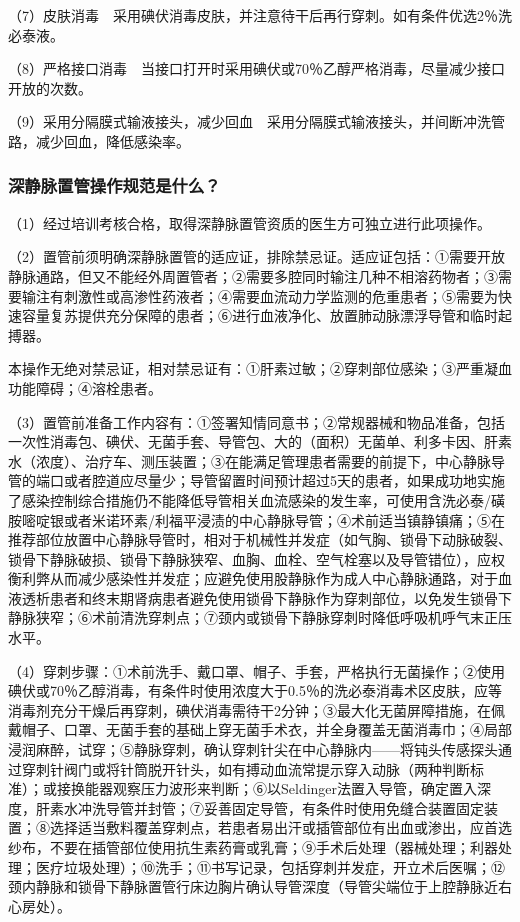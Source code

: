 （7）皮肤消毒　采用碘伏消毒皮肤，并注意待干后再行穿刺。如有条件优选2％洗必泰液。

（8）严格接口消毒　当接口打开时采用碘伏或70％乙醇严格消毒，尽量减少接口开放的次数。

（9）采用分隔膜式输液接头，减少回血　采用分隔膜式输液接头，并间断冲洗管路，减少回血，降低感染率。

\subsubsection{深静脉置管操作规范是什么？}

（1）经过培训考核合格，取得深静脉置管资质的医生方可独立进行此项操作。

（2）置管前须明确深静脉置管的适应证，排除禁忌证。适应证包括：①需要开放静脉通路，但又不能经外周置管者；②需要多腔同时输注几种不相溶药物者；③需要输注有刺激性或高渗性药液者；④需要血流动力学监测的危重患者；⑤需要为快速容量复苏提供充分保障的患者；⑥进行血液净化、放置肺动脉漂浮导管和临时起搏器。

本操作无绝对禁忌证，相对禁忌证有：①肝素过敏；②穿刺部位感染；③严重凝血功能障碍；④溶栓患者。

（3）置管前准备工作内容有：①签署知情同意书；②常规器械和物品准备，包括一次性消毒包、碘伏、无菌手套、导管包、大的（面积）无菌单、利多卡因、肝素水（浓度）、治疗车、测压装置；③在能满足管理患者需要的前提下，中心静脉导管的端口或者腔道应尽量少；导管留置时间预计超过5天的患者，如果成功地实施了感染控制综合措施仍不能降低导管相关血流感染的发生率，可使用含洗必泰/磺胺嘧啶银或者米诺环素/利福平浸渍的中心静脉导管；④术前适当镇静镇痛；⑤在推荐部位放置中心静脉导管时，相对于机械性并发症（如气胸、锁骨下动脉破裂、锁骨下静脉破损、锁骨下静脉狭窄、血胸、血栓、空气栓塞以及导管错位），应权衡利弊从而减少感染性并发症；应避免使用股静脉作为成人中心静脉通路，对于血液透析患者和终末期肾病患者避免使用锁骨下静脉作为穿刺部位，以免发生锁骨下静脉狭窄；⑥术前清洗穿刺点；⑦颈内或锁骨下静脉穿刺时降低呼吸机呼气末正压水平。

（4）穿刺步骤：①术前洗手、戴口罩、帽子、手套，严格执行无菌操作；②使用碘伏或70％乙醇消毒，有条件时使用浓度大于0.5％的洗必泰消毒术区皮肤，应等消毒剂充分干燥后再穿刺，碘伏消毒需待干2分钟；③最大化无菌屏障措施，在佩戴帽子、口罩、无菌手套的基础上穿无菌手术衣，并全身覆盖无菌消毒巾；④局部浸润麻醉，试穿；⑤静脉穿刺，确认穿刺针尖在中心静脉内------将钝头传感探头通过穿刺针阀门或将针筒脱开针头，如有搏动血流常提示穿入动脉（两种判断标准）；或接换能器观察压力波形来判断；⑥以Seldinger法置入导管，确定置入深度，肝素水冲洗导管并封管；⑦妥善固定导管，有条件时使用免缝合装置固定装置；⑧选择适当敷料覆盖穿刺点，若患者易出汗或插管部位有出血或渗出，应首选纱布，不要在插管部位使用抗生素药膏或乳膏；⑨手术后处理（器械处理；利器处理；医疗垃圾处理）；⑩洗手；⑪书写记录，包括穿刺并发症，开立术后医嘱；⑫颈内静脉和锁骨下静脉置管行床边胸片确认导管深度（导管尖端位于上腔静脉近右心房处）。

